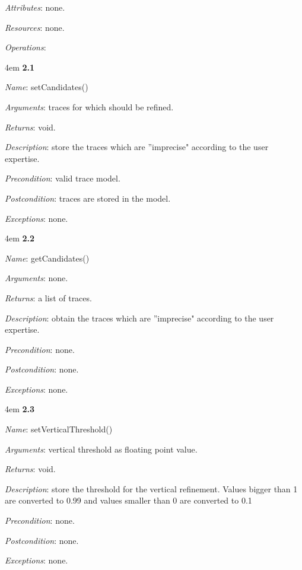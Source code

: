 \documentclass[notitlepage]{article}
\begin{document}
\begin{flushleft}
\textit{Attributes}: none.

\textit{Resources}: none.

\textit{Operations}: 
\medskip


\par
\begingroup
\leftskip4em
\textbf{2.1} 

\textit{Name}: setCandidates()

\textit{Arguments}: traces for which should be refined.

\textit{Returns}: void.

\textit{Description}: store the traces which are ''imprecise" according to the user expertise. 

\textit{Precondition}: valid trace model.

\textit{Postcondition}: traces are stored in the model.

\textit{Exceptions}: none.

\par
\endgroup

\medskip


\par
\begingroup
\leftskip4em
\textbf{2.2} 

\textit{Name}: getCandidates()

\textit{Arguments}: none.

\textit{Returns}: a list of traces.

\textit{Description}: obtain the traces which are ''imprecise" according to the user expertise. 

\textit{Precondition}: none.

\textit{Postcondition}: none.

\textit{Exceptions}: none.
\par
\endgroup

\par
\begingroup
\leftskip4em
\textbf{2.3} 

\textit{Name}: setVerticalThreshold()

\textit{Arguments}: vertical threshold as floating point value.

\textit{Returns}: void.

\textit{Description}: store the threshold for the vertical refinement. Values bigger than 1 are converted to 0.99 and values smaller than 0 are converted to 0.1

\textit{Precondition}: none.

\textit{Postcondition}: none.

\textit{Exceptions}: none.
\par
\endgroup



\end{flushleft}
\end{document}
